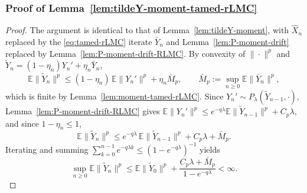 \documentclass[11pt,a4paper,reqno]{amsart}
\theoremstyle{plain}
\theoremstyle{definition}
\theoremstyle{remark}
\newcommand{\E}{\mathbb{E}}
\begin{document}
\subsubsection{Proof of Lemma~\ref{lem:tildeY-moment-tamed-rLMC}}
\label{subsec:proof-tildeY-moment-tamed-rLMC}
\begin{proof}
The argument is identical to that of Lemma~\ref{lem:tildeY-moment}, with $\widehat X_n$ replaced by the \eqref{eq:tamed-rLMC} iterate $\bar Y_n$ and Lemma~\ref{lem:P-moment-drift} replaced by Lemma~\ref{lem:P-moment-drift-RLMC}. By convexity of $\|\cdot\|^p$ and $\widetilde Y_n=(1-\eta_n)Y_n'+\eta_n\bar Y_n$,
\[
  \E\|\widetilde Y_n\|^p
  \le
  (1-\eta_n)\,\E\|Y_n'\|^p+\eta_n\bar M_p,
  \qquad
  \bar M_p:=\sup_{n\ge0}\E\|\bar Y_n\|^p,
\]
which is finite by Lemma~\ref{lem:moment-tamed-rLMC}. Since $Y_n'\sim P_\lambda(\widetilde Y_{n-1},\cdot)$, Lemma~\ref{lem:P-moment-drift-RLMC} gives $\E\|Y_n'\|^p\le e^{-q\lambda}\E\|\widetilde Y_{n-1}\|^p+C_p\lambda$, and since $1-\eta_n\le1$,
\[
  \E\|\widetilde Y_n\|^p
  \le
  e^{-q\lambda}\,\E\|\widetilde Y_{n-1}\|^p+C_p\lambda+\bar M_p.
\]
Iterating and summing $\sum_{k=0}^{n-1}e^{-q\lambda k}\le(1-e^{-q\lambda})^{-1}$ yields
\[
  \sup_{n\ge0}\E\|\widetilde Y_n\|^p
  \le
  \E\|\widetilde Y_0\|^p+\frac{C_p\lambda+\bar M_p}{1-e^{-q\lambda}}
  <\infty.
\]
\end{proof}
\end{document}
